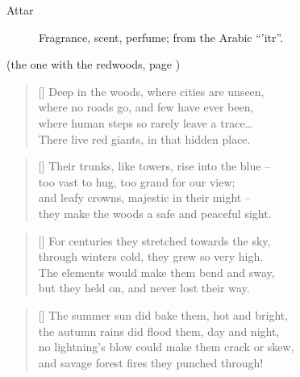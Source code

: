 \vspace{1cm}
\begin{description}
	\item[Attar] Fragrance, scent, perfume; from the Arabic ``'itr''.
\end{description}


\clearpage
\PlainPoemTitle
{}
\vspace{-5mm}
\begin{center}
	(the one with the redwoods, page \pageref{poem:red-giants.ru})
\end{center}
\vspace{-4mm}
\settowidth{\versewidth}{Despite life's maze they stand and want to share –}
\begin{verse}[\versewidth]
	Deep in the woods, where cities are unseen,\\
	where no roads go, and few have ever been,\\
	where human steps so rarely leave a trace\ldots\\
	There live red giants, in that hidden place.
\end{verse}

\begin{verse}[\versewidth]
	Their trunks, like towers, rise into the blue --\\
	too vast to hug, too grand for our view;\\
	and leafy crowns, majestic in their might --\\
	they make the woods a safe and peaceful sight.
\end{verse}

\begin{verse}[\versewidth]
	For centuries they stretched towards the sky,\\
	through winters cold, they grew so very high.\\
	The elements would make them bend and sway,\\
	but they held on, and never lost their way.
\end{verse}

\begin{verse}[\versewidth]
	The summer sun did bake them, hot and bright,\\
	the autumn rains did flood them, day and night,\\
	no lightning's blow could make them crack or skew,\\
	 and savage forest fires they punched through!
	
\end{verse}

